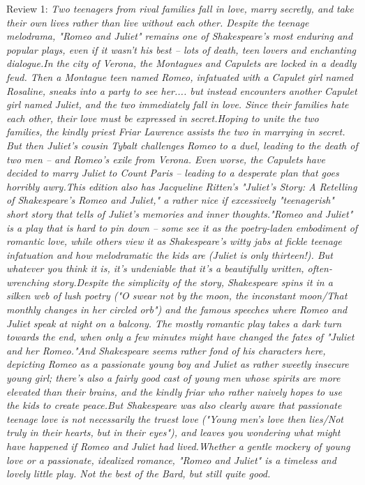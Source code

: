 \documentclass[12pt, a4paper]{article}
\begin{document}
\begin{itemize}
    {\fontsize{9pt}{11pt}\selectfont
    \item Review 1: \textit{Two teenagers from rival families fall in love, marry secretly, and take their own lives rather than live without each other. Despite the teenage melodrama, "Romeo and Juliet" remains one of Shakespeare's most enduring and popular plays, even if it wasn't his best -- lots of death, teen lovers and enchanting dialogue.In the city of Verona, the Montagues and Capulets are locked in a deadly feud. Then a Montague teen named Romeo, infatuated with a Capulet girl named Rosaline, sneaks into a party to see her.... but instead encounters another Capulet girl named Juliet, and the two immediately fall in love. Since their families hate each other, their love must be expressed in secret.Hoping to unite the two families, the kindly priest Friar Lawrence assists the two in marrying in secret. But then Juliet's cousin Tybalt challenges Romeo to a duel, leading to the death of two men -- and Romeo's exile from Verona. Even worse, the Capulets have decided to marry Juliet to Count Paris -- leading to a desperate plan that goes horribly awry.This edition also has Jacqueline Ritten's "Juliet's Story: A Retelling of Shakespeare's Romeo and Juliet," a rather nice if excessively "teenagerish" short story that tells of Juliet's memories and inner thoughts."Romeo and Juliet" is a play that is hard to pin down -- some see it as the poetry-laden embodiment of romantic love, while others view it as Shakespeare's witty jabs at fickle teenage infatuation and how melodramatic the kids are (Juliet is only thirteen!). But whatever you think it is, it's undeniable that it's a beautifully written, often-wrenching story.Despite the simplicity of the story, Shakespeare spins it in a silken web of lush poetry ("O swear not by the moon, the inconstant moon/That monthly changes in her circled orb") and the famous speeches where Romeo and Juliet speak at night on a balcony. The mostly romantic play takes a dark turn towards the end, when only a few minutes might have changed the fates of "Juliet and her Romeo."And Shakespeare seems rather fond of his characters here, depicting Romeo as a passionate young boy and Juliet as rather sweetly insecure young girl; there's also a fairly good cast of young men whose spirits are more elevated than their brains, and the kindly friar who rather naively hopes to use the kids to create peace.But Shakespeare was also clearly aware that passionate teenage love is not necessarily the truest love ("Young men's love then lies/Not truly in their hearts, but in their eyes"), and leaves you wondering what might have happened if Romeo and Juliet had lived.Whether a gentle mockery of young love or a passionate, idealized romance, "Romeo and Juliet" is a timeless and lovely little play. Not the best of the Bard, but still quite good.}
}
\end{itemize}
\end{document}
